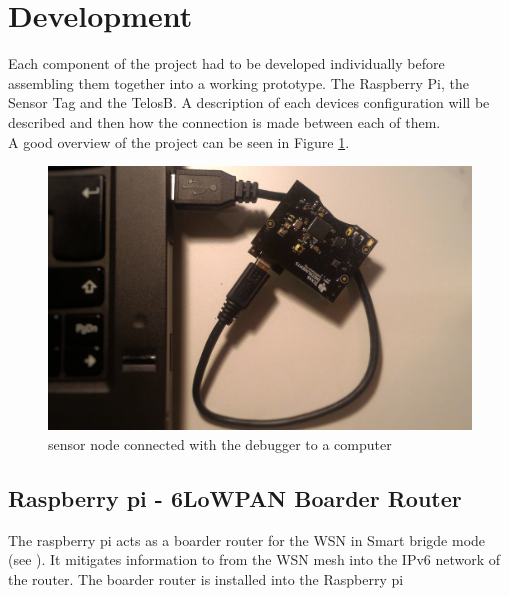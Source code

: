 \section{Development}

Each component of the project had to be developed individually before assembling them together into a working prototype. The Raspberry Pi, the Sensor Tag and the TelosB. A description of each devices configuration will be described and then how the connection is made between each of them.\\

A good overview of the project can be seen in Figure \ref{fig:over}.

\begin{figure}[!h]
	\begin{center}
		\includegraphics[width=0.8\linewidth]{debugger}
		\caption{sensor node connected with the debugger to a computer}
		\label{fig:over}
	\end{center}
	
\end{figure} 

\subsection{Raspberry pi - 6LoWPAN Boarder Router}

The raspberry pi acts as a boarder router for the WSN in Smart brigde mode (see ). It mitigates information to from the WSN mesh into the IPv6 network of the router. The boarder router is installed into the Raspberry pi 


